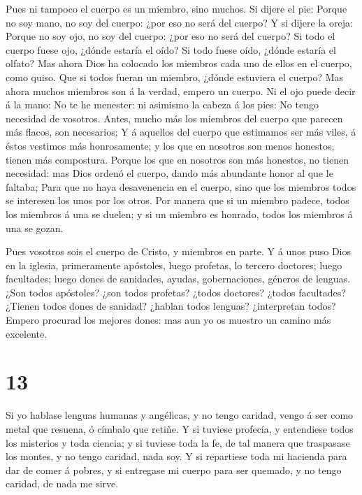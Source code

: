  Pues ni tampoco el cuerpo es un miembro, sino muchos.
 Si dijere el pie: Porque no soy mano, no soy del cuerpo:
¿por eso no será del cuerpo?  Y si dijere la oreja: Porque
no soy ojo, no soy del cuerpo: ¿por eso no será del cuerpo?
 Si todo el cuerpo fuese ojo, ¿dónde estaría el oído? Si
todo fuese oído, ¿dónde estaría el olfato?  Mas ahora Dios
ha colocado los miembros cada uno de ellos en el cuerpo, como quiso.
 Que si todos fueran un miembro, ¿dónde estuviera el
cuerpo?  Mas ahora muchos miembros son á la verdad, empero
un cuerpo.  Ni el ojo puede decir á la mano: No te he
menester: ni asimismo la cabeza á los pies: No tengo necesidad de
vosotros.  Antes, mucho más los miembros del cuerpo que
parecen más flacos, son necesarios;  Y á aquellos del
cuerpo que estimamos ser más viles, á éstos vestimos más honrosamente; y
los que en nosotros son menos honestos, tienen más compostura.
 Porque los que en nosotros son más honestos, no tienen
necesidad: mas Dios ordenó el cuerpo, dando más abundante honor al que
le faltaba;  Para que no haya desavenencia en el cuerpo,
sino que los miembros todos se interesen los unos por los otros.
 Por manera que si un miembro padece, todos los miembros á
una se duelen; y si un miembro es honrado, todos los miembros á una se
gozan.

 Pues vosotros sois el cuerpo de Cristo, y miembros en
parte.  Y á unos puso Dios en la iglesia, primeramente
apóstoles, luego profetas, lo tercero doctores; luego facultades; luego
dones de sanidades, ayudas, gobernaciones, géneros de lenguas.
 ¿Son todos apóstoles? ¿son todos profetas? ¿todos
doctores? ¿todos facultades?  ¿Tienen todos dones de
sanidad? ¿hablan todos lenguas? ¿interpretan todos?  Empero
procurad los mejores dones: mas aun yo os muestro un camino más
excelente.

\hypertarget{section-12}{%
\section{13}\label{section-12}}

 Si yo hablase lenguas humanas y angélicas, y no tengo
caridad, vengo á ser como metal que resuena, ó címbalo que retiñe.
 Y si tuviese profecía, y entendiese todos los misterios y
toda ciencia; y si tuviese toda la fe, de tal manera que traspasase los
montes, y no tengo caridad, nada soy.  Y si repartiese toda
mi hacienda para dar de comer á pobres, y si entregase mi cuerpo para
ser quemado, y no tengo caridad, de nada me sirve.

